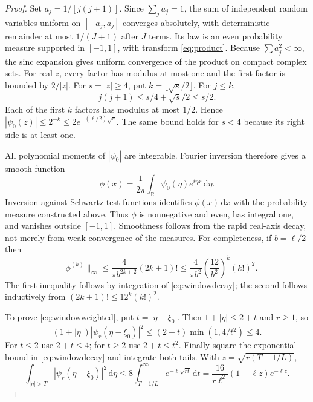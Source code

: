 \documentclass[11pt]{article}
\theoremstyle{remark}\newtheorem{remark}[theorem]{Remark}
\newcommand{\R}{\mathbb R}
\newcommand{\dd}{\,\mathrm d}
\newcommand{\norm}[1]{\lVert #1\rVert}
\numberwithin{equation}{section}
\begin{document}
\begin{proof}
Set $a_j=1/[j(j+1)]$. Since $\sum_j a_j=1$, the sum of independent random variables uniform on $[-a_j,a_j]$ converges absolutely, with deterministic remainder at most $1/(J+1)$ after $J$ terms. Its law is an even probability measure supported in $[-1,1]$, with transform \eqref{eq:product}. Because $\sum a_j^2<\infty$, the sinc expansion gives uniform convergence of the product on compact complex sets.
For real $z$, every factor has modulus at most one and the first factor is bounded by $2/|z|$. For $s=|z|\ge4$, put $k=\lfloor\sqrt s/2\rfloor$. For $j\le k$,
\[
 j(j+1)\le s/4+\sqrt s/2\le s/2.
\]
Each of the first $k$ factors has modulus at most $1/2$. Hence
$|\psi_0(z)|\le2^{-k}\le2e^{-(\ell/2)\sqrt s}$.
The same bound holds for $s<4$ because its right side is at least one.

All polynomial moments of $|\psi_0|$ are integrable. Fourier inversion therefore gives a smooth function
\[
 \phi(x)=\frac1{2\pi}\int_\R\psi_0(\eta)e^{i\eta x}\dd\eta.
\]
Inversion against Schwartz test functions identifies $\phi(x)\dd x$ with the probability measure constructed above. Thus $\phi$ is nonnegative and even, has integral one, and vanishes outside $[-1,1]$. Smoothness follows from the rapid real-axis decay, not merely from weak convergence of the measures. For completeness, if $b=\ell/2$ then
\begin{equation}\label{eq:gevrey}
 \norm{\phi^{(k)}}_\infty
 \le\frac4{\pi b^{2k+2}}(2k+1)!
 \le\frac4{\pi b^2}\left(\frac{12}{b^2}\right)^k(k!)^2.
\end{equation}
The first inequality follows by integration of \eqref{eq:windowdecay}; the second follows inductively from $(2k+1)!\le12^k(k!)^2$.

To prove \eqref{eq:windowweighted}, put $t=|\eta-\xi_0|$. Then $1+|\eta|\le2+t$ and $r\ge1$, so
\[
 (1+|\eta|)|\psi_r(\eta-\xi_0)|^2
 \le(2+t)\min(1,4/t^2)\le4.
\]
For $t\le2$ use $2+t\le4$; for $t\ge2$ use $2+t\le t^2$.
Finally square the exponential bound in \eqref{eq:windowdecay} and integrate both tails. With $z=\sqrt{r(T-1/L)}$,
\[
 \int_{|\eta|>T}|\psi_r(\eta-\xi_0)|^2\dd\eta
 \le8\int_{T-1/L}^\infty e^{-\ell\sqrt{rt}}\dd t
 =\frac{16}{r\ell^2}(1+\ell z)e^{-\ell z}.
\]
\end{proof}
\end{document}
